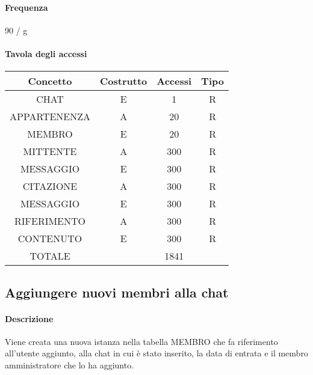 \documentclass[a4paper,12pt]{report}
\begin{document}
\paragraph{Frequenza} 90 / g
\begin{table}[H]
\paragraph{Tavola degli accessi\newline}
\begin{tabular}{|c|c|c|c|}
\hline
Concetto     & Costrutto & Accessi & Tipo \\ \hline
CHAT         & E         & 1       & R    \\ \hline
APPARTENENZA & A         & 20      & R    \\ \hline
MEMBRO       & E         & 20      & R    \\ \hline
MITTENTE     & A         & 300     & R    \\ \hline
MESSAGGIO    & E         & 300     & R    \\ \hline
CITAZIONE    & A         & 300     & R    \\ \hline
MESSAGGIO    & E         & 300     & R    \\ \hline
RIFERIMENTO  & A         & 300     & R    \\ \hline
CONTENUTO    & E         & 300     & R    \\ \hline
TOTALE       &           & 1841    &      \\ \hline
\end{tabular}
\end{table}
\subsection{Aggiungere nuovi membri alla chat} \label{aggiungere_membri}
\paragraph{Descrizione} Viene creata una nuova istanza nella tabella MEMBRO che fa riferimento all'utente aggiunto, alla chat in cui è stato inserito, la data di entrata e il membro amministratore che lo ha aggiunto.
\end{document}

